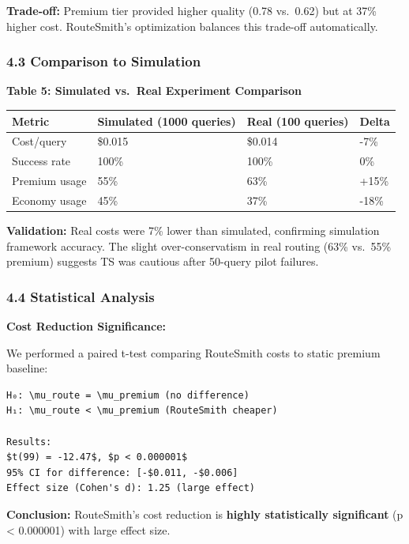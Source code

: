 \documentclass[
  11pt,
]{article}
\begin{document}
\textbf{Trade-off:} Premium tier provided higher quality (0.78 vs.~0.62)
but at 37\% higher cost. RouteSmith's optimization balances this
trade-off automatically.

\hypertarget{comparison-to-simulation}{%
\subsubsection{4.3 Comparison to
Simulation}\label{comparison-to-simulation}}

\textbf{Table 5: Simulated vs.~Real Experiment Comparison}

\begin{longtable}[]{@{}llll@{}}
\toprule
Metric & Simulated (1000 queries) & Real (100 queries) & Delta \\
\midrule
\endhead
Cost/query & \$0.015 & \$0.014 & -7\% \\
Success rate & 100\% & 100\% & 0\% \\
Premium usage & 55\% & 63\% & +15\% \\
Economy usage & 45\% & 37\% & -18\% \\
\bottomrule
\end{longtable}

\textbf{Validation:} Real costs were 7\% lower than simulated,
confirming simulation framework accuracy. The slight over-conservatism
in real routing (63\% vs.~55\% premium) suggests TS was cautious after
50-query pilot failures.

\hypertarget{statistical-analysis}{%
\subsubsection{4.4 Statistical Analysis}\label{statistical-analysis}}

\textbf{Cost Reduction Significance:}

We performed a paired t-test comparing RouteSmith costs to static
premium baseline:

\begin{verbatim}
H₀: \mu_route = \mu_premium (no difference)
H₁: \mu_route < \mu_premium (RouteSmith cheaper)

Results:
$t(99) = -12.47$, $p < 0.000001$
95% CI for difference: [-$0.011, -$0.006]
Effect size (Cohen's d): 1.25 (large effect)
\end{verbatim}

\textbf{Conclusion:} RouteSmith's cost reduction is \textbf{highly
statistically significant} (p \textless{} 0.000001) with large effect
size.
\end{document}
